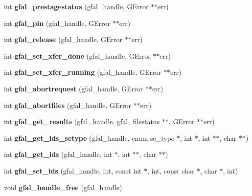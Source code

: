 \begin{CompactItemize}
\item 
int \textbf{gfal\_\-prestagestatus} (gfal\_\-handle, GError $\ast$$\ast$err)\label{group__srm__group_g6e1fad549e7d87ccba3f5aad262c4bb7}

\item 
int \textbf{gfal\_\-pin} (gfal\_\-handle, GError $\ast$$\ast$err)\label{group__srm__group_g2071e5e174ad0e186b2e2ed221ff254a}

\item 
int \textbf{gfal\_\-release} (gfal\_\-handle, GError $\ast$$\ast$err)\label{group__srm__group_g1814902f6764e9895555b337ebe072cf}

\item 
int \textbf{gfal\_\-set\_\-xfer\_\-done} (gfal\_\-handle, GError $\ast$$\ast$err)\label{group__srm__group_g53578369e607b8ee44ca5acdd1723e46}

\item 
int \textbf{gfal\_\-set\_\-xfer\_\-running} (gfal\_\-handle, GError $\ast$$\ast$err)\label{group__srm__group_g28565cf7c05f3dcfe82f3d7f716ae39a}

\item 
int \textbf{gfal\_\-abortrequest} (gfal\_\-handle, GError $\ast$$\ast$err)\label{group__srm__group_g31c2fcfa5efdb1a7c93ffaaa457d9357}

\item 
int \textbf{gfal\_\-abortfiles} (gfal\_\-handle, GError $\ast$$\ast$err)\label{group__srm__group_g009a98403584e32536a8d7ebe66284fd}

\item 
int \textbf{gfal\_\-get\_\-results} (gfal\_\-handle, gfal\_\-filestatus $\ast$$\ast$, GError $\ast$$\ast$err)\label{group__srm__group_g3b4725f553de6720a80036d28a4fb28d}

\item 
int \textbf{gfal\_\-get\_\-ids\_\-setype} (gfal\_\-handle, enum se\_\-type $\ast$, int $\ast$, int $\ast$$\ast$, char $\ast$$\ast$)\label{group__srm__group_g2bed7d372296a8d43282cea69ccb663e}

\item 
int \textbf{gfal\_\-get\_\-ids} (gfal\_\-handle, int $\ast$, int $\ast$$\ast$, char $\ast$$\ast$)\label{group__srm__group_g72418d9d0374b8beca6fca284a8e5db2}

\item 
int \textbf{gfal\_\-set\_\-ids} (gfal\_\-handle, int, const int $\ast$, int, const char $\ast$, char $\ast$, int)\label{group__srm__group_g5da8c01443270bf26cb6f60fe1457c53}

\item 
void \textbf{gfal\_\-handle\_\-free} (gfal\_\-handle)\label{group__srm__group_ga21bc6b4163400d28590637b474a1b05}

\end{CompactItemize}

